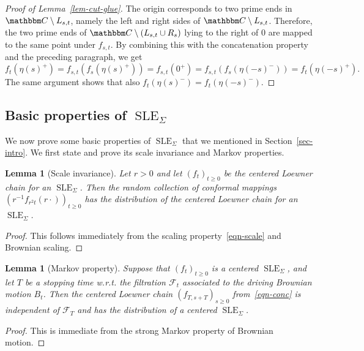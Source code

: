 \documentclass[11pt]{article}
\theoremstyle{plain}
\newtheorem{lem}[thm]{Lemma}
\theoremstyle{definition}
\numberwithin{equation}{section}
\newcommand{\eqbn}{\begin{equation*}}
\newcommand{\eqen}{\end{equation*}}
\newcommand{\BB}{\mathbbm}
\newcommand{\mcl}{\mathcal}
\newcommand{\SLEG}{{\operatorname{SLE}}_\Sigma}
\begin{document}
\begin{proof}[Proof of Lemma~\ref{lem-cut-glue}]
The origin corresponds to two prime ends in $\BB C\setminus L_{s,t}$, namely the left and right sides of $\BB C\setminus L_{s,t}$. Therefore, the two prime ends of $\BB C\setminus (L_{s,t} \cup R_s)$ lying to the right of 0 are mapped to the same point under $f_{s,t}$. By combining this with the concatenation property and the preceding paragraph, we get
\eqbn
f_t(\eta(s)^+) = f_{s,t}(f_s(\eta(s)^+) ) = f_{s,t}(0^+) = f_{s,t}(f_s(\eta(-s)^-)) = f_t(\eta(-s)^+) .
\eqen
The same argument shows that also $f_t(\eta(s)^-)= f_t(\eta(-s)^-)$.
\end{proof}




 

\subsection{Basic properties of $\SLEG$}
\label{sec-basics-sleg}

We now prove some basic properties of $\SLEG$ that we mentioned in Section~\ref{sec-intro}.  We first state and prove its scale invariance and Markov properties.


\begin{lem}[Scale invariance] \label{lem-scaling}
Let $r>0$ and let $(f_t)_{t \geq 0}$ be the centered Loewner chain for an $\SLEG$. Then the random collection of conformal mappings $(r^{-1} f_{r^2 t}(r\cdot))_{t\geq 0}$ has the distribution of the centered Loewner chain for an $\SLEG$.
\end{lem}

\begin{proof}
This follows immediately from the scaling property~\eqref{eqn-scale} and Brownian scaling. 
\end{proof}

\begin{lem}[Markov property]
Suppose that $(f_t)_{t \geq 0}$ is a centered $\SLEG$, and let $T$ be a stopping time w.r.t. the filtration $\mcl F_t$ associated to the driving Brownian motion $B_t$.  Then the centered Loewner chain $( f_{T,s+T} )_{s\geq 0}$ from~\eqref{eqn-conc} is independent of $\mcl F_T$ and has the distribution of a centered $\SLEG$.  
\label{lem-markov}
\end{lem}
 
\begin{proof}%
This is immediate from the strong Markov property of Brownian motion. 
\end{proof}
\end{document}
